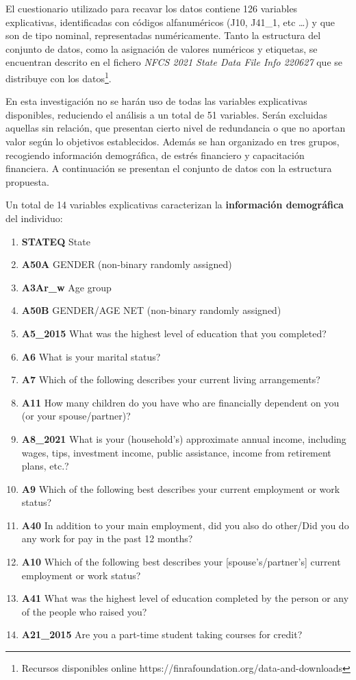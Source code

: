 \documentclass[a4paper, 11pt]{article}
\begin{document}
El cuestionario utilizado para recavar los datos contiene 126 variables explicativas, identificadas con códigos 
alfanuméricos (J10, J41\_1, etc \dots) y que son de tipo nominal, representadas numéricamente. Tanto la estructura
del conjunto de datos, como la asignación de valores numéricos y etiquetas, se encuentran descrito en el fichero 
\textit{NFCS 2021 State Data File Info 220627} que se distribuye con los datos\footnote{Recursos disponibles online https://finrafoundation.org/data-and-downloads}. 

En esta investigación no se harán uso de todas las variables explicativas disponibles, reduciendo el análisis a un total de 51 variables. Serán excluidas aquellas sin relación, que presentan cierto nivel de redundancia o que no aportan valor según lo
objetivos establecidos. Además se han organizado en tres grupos, recogiendo información demográfica, de estrés financiero y
capacitación financiera. A continuación se presentan el conjunto de datos con la estructura propuesta.

Un total de 14 variables explicativas caracterizan la \textbf{información demográfica} del individuo:
\begin{enumerate}
    \item \textbf{STATEQ} State
    \item \textbf{A50A} GENDER (non-binary randomly assigned)
    \item \textbf{A3Ar\_w} Age group
    \item \textbf{A50B} GENDER/AGE NET (non-binary randomly assigned)
    \item \textbf{A5\_2015} What was the highest level of education that you completed?
    \item \textbf{A6} What is your marital status?
    \item \textbf{A7} Which of the following describes your current living arrangements?
    \item \textbf{A11} How many children do you have who are financially dependent on you (or your spouse/partner)? 
    \item \textbf{A8\_2021} What is your (household's) approximate annual income, including wages, tips, investment
    income, public assistance, income from retirement plans, etc.?
    \item \textbf{A9} Which of the following best describes your current employment or work status?
    \item \textbf{A40} In addition to your main employment, did you also do other/Did you do any work for pay
    in the past 12 months?
    \item \textbf{A10} Which of the following best describes your [spouse's/partner's] current employment or
    work status? 
    \item \textbf{A41} What was the highest level of education completed by the person or any of the people who
    raised you?
    \item \textbf{A21\_2015} Are you a part-time student taking courses for credit?
\end{enumerate}
\end{document}
